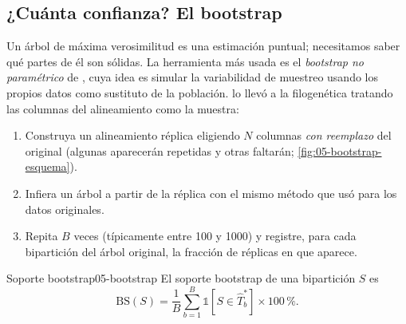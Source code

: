 \subsection{¿Cuánta confianza? El bootstrap}

Un árbol de máxima verosimilitud es una estimación puntual; necesitamos saber qué partes de él son sólidas. La herramienta más usada es el \emph{bootstrap no paramétrico} de \textcite{c05-efron1979}, cuya idea es simular la variabilidad de muestreo usando los propios datos como sustituto de la población. \textcite{c05-felsenstein1985} lo llevó a la filogenética tratando las columnas del alineamiento como la muestra:

\begin{enumerate}
  \item Construya un alineamiento réplica eligiendo $N$ columnas \emph{con reemplazo} del original (algunas aparecerán repetidas y otras faltarán; \cref{fig:05-bootstrap-esquema}).
  \item Infiera un árbol a partir de la réplica con el mismo método que usó para los datos originales.
  \item Repita $B$ veces (típicamente entre 100 y 1000) y registre, para cada bipartición del árbol original, la fracción de réplicas en que aparece.
\end{enumerate}

\begin{definicion}{Soporte bootstrap}{05-bootstrap}
El soporte bootstrap de una bipartición $S$ es
\begin{equation}\label{eq:05-bootstrap}
\mathrm{BS}(S) = \frac{1}{B}\sum_{b=1}^{B}\mathbb 1\left[S\in \hat T^{*}_{b}\right]\times 100\,\%.
\end{equation}
\end{definicion}

\begin{simbolos}
\end{simbolos}

